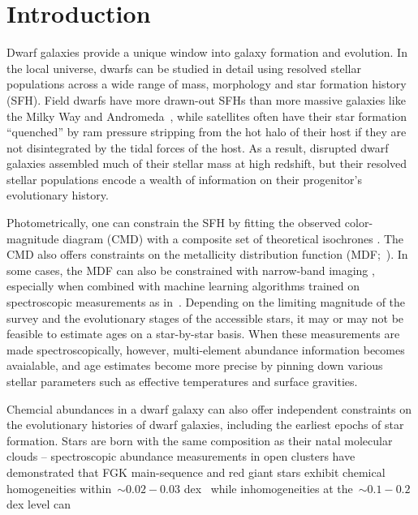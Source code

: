 \documentclass[ms.tex]{subfiles}
\begin{document}
\section{Introduction}
\label{sec:intro}

Dwarf galaxies provide a unique window into galaxy formation and evolution.
In the local universe, dwarfs can be studied in detail using resolved stellar
populations across a wide range of mass, morphology and star formation history
(SFH).
Field dwarfs have more drawn-out SFHs than more massive galaxies like the Milky
Way and Andromeda~\citep[e.g.,][]{Behroozi2019, GarrisonKimmel2019}, while
satellites often have their star formation ``quenched'' by ram pressure
stripping from the hot halo of their host
\citep*[see discussion in, e.g.,][]{Steyrleithner2020} if they are not
disintegrated by the tidal forces of the host.
As a result, disrupted dwarf galaxies assembled much of their stellar mass at
high redshift, but their resolved stellar populations encode a wealth of
information on their progenitor's evolutionary history.
\par
Photometrically, one can constrain the SFH by fitting the observed
color-magnitude diagram (CMD) with a composite set of theoretical isochrones
\citep[e.g.,][]{Dolphin2002, Weisz2014b}.
The CMD also offers constraints on the metallicity distribution function
(MDF;~\citealp*[e.g.,][]{Lianou2011}).
In some cases, the MDF can also be constrained with narrow-band imaging
\citep{Fu2022}, especially when combined with machine learning algorithms
trained on spectroscopic measurements as in~\citet{Whitten2011}.
Depending on the limiting magnitude of the survey and the evolutionary stages
of the accessible stars, it may or may not be feasible to estimate ages on a
star-by-star basis.
When these measurements are made spectroscopically, however, multi-element
abundance information becomes avaialable, and age estimates become more precise
by pinning down various stellar parameters such as effective temperatures and
surface gravities.
\par
Chemcial abundances in a dwarf galaxy can also offer independent constraints
on the evolutionary histories of dwarf galaxies, including the earliest epochs
of star formation.
Stars are born with the same composition as their natal molecular clouds --
spectroscopic abundance measurements in open clusters have demonstrated that
FGK main-sequence and red giant stars exhibit chemical homogeneities
within~$\sim$$0.02 - 0.03$ dex~\citep{DeSilva2006, Bovy2016, Liu2016b,
Casamiquela2020} while inhomogeneities at the~$\sim$$0.1 - 0.2$ dex level can
\end{document}
